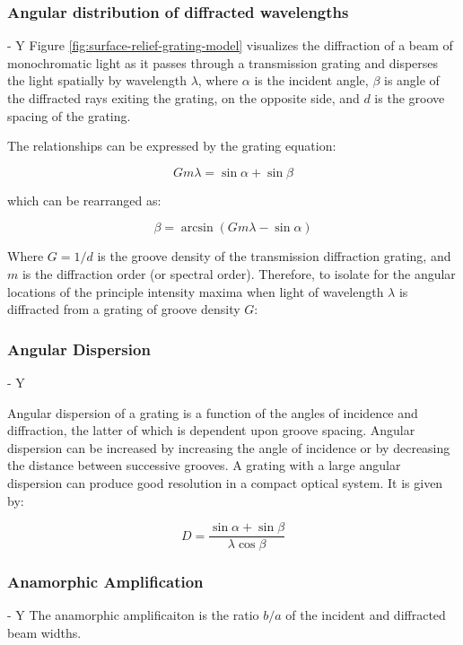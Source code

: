 \subsubsection{Angular distribution of diffracted wavelengths} - Y
Figure \ref{fig:surface-relief-grating-model} visualizes the diffraction of a beam of monochromatic light as it passes through a transmission grating and disperses the light spatially by wavelength $\lambda$, where $\alpha$ is the incident angle, $\beta$ is angle of the diffracted rays exiting the grating, on the opposite side, and $d$ is the groove spacing of the grating. 

The relationships can be expressed by the grating equation:

\begin{equation}
Gm\lambda = \sin\alpha + \sin\beta
\end{equation}

which can be rearranged as:

\begin{equation}
\beta = \arcsin(Gm\lambda - \sin\alpha)
\end{equation}

Where $G = 1/d$ is the groove density of the transmission diffraction grating, and $m$ is the diffraction order (or spectral order). Therefore, to isolate for the angular locations of the principle intensity maxima when light of wavelength $\lambda$ is diffracted from a grating of groove density $G$:

\subsubsection{Angular Dispersion} - Y

Angular dispersion of a grating is a function of the angles of incidence and diffraction, the latter of which is dependent upon groove spacing. Angular dispersion can be increased by increasing the angle of incidence or by decreasing the distance between successive grooves. A grating with a large angular dispersion can produce good resolution in a compact optical system. It is given by:

\begin{equation}
D = \frac{\sin \alpha + \sin \beta}{\lambda \cos\beta}
\end{equation}

\subsubsection{Anamorphic Amplification} - Y
The anamorphic amplificaiton is the ratio $b/a$ of the incident and diffracted beam widths. 

